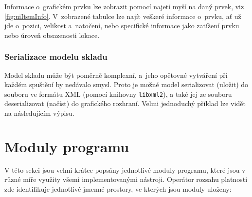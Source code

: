 Informace o~grafickém prvku lze zobrazit pomocí najetí myší na daný prvek, viz \ref{fig:uiItemInfo}. V~zobrazené tabulce lze najít veškeré informace o~prvku, ať už jde o~pozici, velikost a~natočení, nebo specifické informace jako zatížení prvku nebo úroveň obsazenosti lokace.

\subsubsection{Serializace modelu skladu}
Model skladu může být poměrně komplexní, a~jeho opětovné vytváření při každém spuštění by nedávalo smysl. Proto je možné model serializovat (uložit) do souboru ve formátu XML (pomocí knihovny \texttt{libxml2}), a také jej ze souboru deserializovat (načíst) do grafického rozhraní. Velmi jednoduchý příklad lze vidět na následujícím výpisu.
\newpage
{}
    

    
\section{Moduly programu}
V této sekci jsou velmi krátce popsány jednotlivé moduly programu, které jsou v různé míře využity všemi implementovanými nástroji. Operátor rozsahu platnosti zde identifikuje jednotlivé jmenné prostory, ve kterých jsou moduly uloženy:

